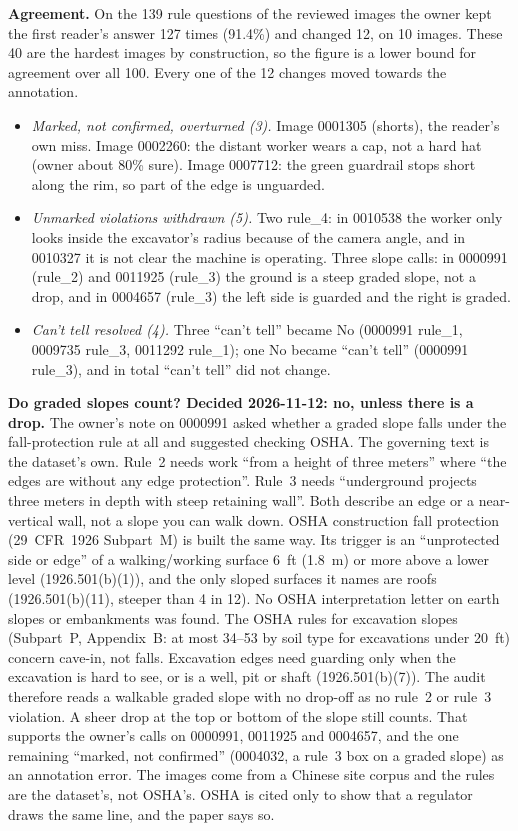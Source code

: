 \textbf{Agreement.} On the 139 rule questions of the reviewed images the owner kept the first reader's answer
127 times (91.4\%) and changed 12, on 10 images. These 40 are the hardest images by construction, so the
figure is a lower bound for agreement over all 100. Every one of the 12 changes moved towards the
annotation.
\begin{itemize}
\item \emph{Marked, not confirmed, overturned (3).} Image 0001305 (shorts), the reader's own miss. Image 0002260:
the distant worker wears a cap, not a hard hat (owner about 80\% sure). Image 0007712: the green guardrail stops
short along the rim, so part of the edge is unguarded.
\item \emph{Unmarked violations withdrawn (5).} Two rule\_4: in 0010538 the worker only looks inside the
excavator's radius because of the camera angle, and in 0010327 it is not clear the machine is operating.
Three slope calls: in 0000991 (rule\_2) and 0011925 (rule\_3) the ground is a steep graded slope, not a drop,
and in 0004657 (rule\_3) the left side is guarded and the right is graded.
\item \emph{Can't tell resolved (4).} Three ``can't tell'' became No (0000991 rule\_1, 0009735 rule\_3, 0011292
rule\_1); one No became ``can't tell'' (0000991 rule\_3), and in total ``can't tell'' did not change.
\end{itemize}
\textbf{Do graded slopes count? Decided 2026-11-12: no, unless there is a drop.} The owner's note on 0000991
asked whether a graded slope falls under the fall-protection rule at all and suggested checking OSHA.
The governing text is the dataset's own. Rule~2 needs work ``from a height of three meters'' where ``the
edges are without any edge protection''. Rule~3 needs ``underground projects three meters in depth with
steep retaining wall''. Both describe an edge or a near-vertical wall, not a slope you can walk down. OSHA
construction fall protection (29~CFR~1926 Subpart~M) is built the same way. Its trigger is an ``unprotected
side or edge'' of a walking/working surface 6~ft (1.8~m) or more above a lower level (1926.501(b)(1)), and
the only sloped surfaces it names are roofs (1926.501(b)(11), steeper than 4 in 12). No OSHA interpretation
letter on earth slopes or embankments was found. The OSHA rules for excavation slopes (Subpart~P,
Appendix~B: at most 34--53\textdegree{} by soil type for excavations under 20~ft) concern cave-in, not
falls. Excavation edges need guarding only when the excavation is hard to see, or is a well, pit or shaft
(1926.501(b)(7)). The audit therefore reads a walkable graded slope with no drop-off as no rule~2 or rule~3
violation. A sheer drop at the top or bottom of the slope still counts. That supports the owner's calls on
0000991, 0011925 and 0004657, and the one remaining ``marked, not confirmed'' (0004032, a rule~3 box on a
graded slope) as an annotation error. The images come from a Chinese site corpus and the rules are the
dataset's, not OSHA's. OSHA is cited only to show that a regulator draws the same line, and the paper says
so.

